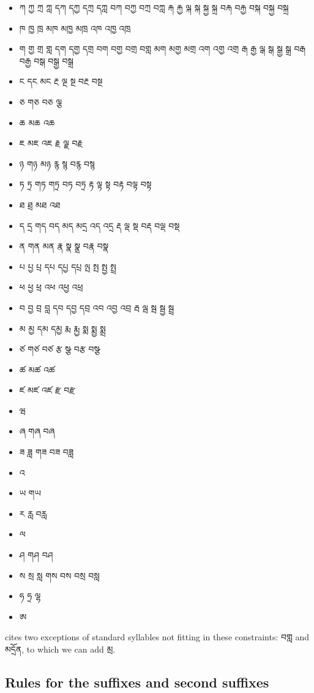 \documentclass[%
a4paper,%
pagesize,%
12pt,%
parskip=off,%
bibliography=totoc,%
numbers=noenddot,%
DIV=12,%
twoside=semi,%
headings=normal%
]{scrartcl}
\begin{document}
\begin{itemize}
\item ཀ ཀྱ ཀྲ ཀླ དཀ དཀྱ དཀྲ དཀླ བཀ བཀྱ བཀྲ བཀླ རྐ རྐྱ ལྐ སྐ སྐྱ སྐྲ བརྐ བརྐྱ བསྐ བསྐྱ བསྐྲ
\item ཁ ཁྱ ཁྲ མཁ མཁྱ མཁྲ འཁ འཁྱ འཁྲ
\item ག གྱ གྲ གླ དག དགྱ དགྲ བག བགྱ བགྲ བགླ མག མགྱ མགྲ འག འགྱ འགྲ རྒ རྒྱ ལྒ སྒ སྒྱ སྒྲ བརྒ བརྒྱ བསྒ བསྒྱ བསྒྲ
\item ང དང མང རྔ ལྔ སྔ བརྔ བསྔ
\item ཅ གཅ བཅ ལྕ
\item ཆ མཆ འཆ
\item ཇ མཇ འཇ རྗ ལྗ བརྗ
\item ཉ གཉ མཉ རྙ སྙ བརྙ བསྙ
\item ཏ ཏྲ གཏ གཏྲ བཏ བཏྲ རྟ ལྟ སྟ བརྟ བལྟ བསྟ
\item ཐ ཐྲ མཐ འཐ
\item ད དྲ གད བད མད མདྲ འད འདྲ རྡ ལྡ སྡ བརྡ བལྡ བསྡ
\item ན གན མན རྣ སྣ སྣྲ བརྣ བསྣ
\item པ པྱ པྲ དཔ དཔྱ དཔྲ ལྤ སྤ སྤྱ སྤྲ
\item ཕ ཕྱ ཕྲ འཕ འཕྱ འཕྲ
\item བ བྱ བྲ བླ དབ དབྱ དབྲ འབ འབྱ འབྲ རྦ ལྦ སྦ སྦྱ སྦྲ
\item མ མྱ དམ དམྱ རྨ རྨྱ སྨ སྨྱ སྨྲ
\item ཙ གཙ བཙ རྩ སྩ བརྩ བསྩ
\item ཚ མཚ འཚ
\item ཛ མཛ འཛ རྫ བརྫ
\item ཝ
\item ཞ གཞ བཞ
\item ཟ ཟླ གཟ བཟ བཟླ
\item འ
\item ཡ གཡ
\item ར རླ བརླ
\item ལ
\item ཤ གཤ བཤ
\item ས སྲ སླ གས བས བསྲ བསླ
\item ཧ ཧྲ ལྷ
\item ཨ
\end{itemize}

\cite{TsheshabGrammarTopics} cites two exceptions of standard syllables not fitting in these constraints: བགླ and མདྲོན, to which we can add མྲ.

\subsection{Rules for the suffixes and second suffixes}
\end{document}
